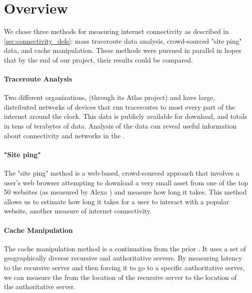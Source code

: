 \section{Overview}\label{sec:methods_overview}

We chose three methods for measuring internet connectivity as described in \cref{sec:connectivity_defs}: mass traceroute data analysis, crowd-sourced "site ping" data, and \dns cache manipulation. These methods were pursued in parallel in hopes that by the end of our project, their results could be compared.

\paragraph{Traceroute Analysis}  Two different organizations, \ripe (through its Atlas project) and \caida have large, distributed networks of devices that run traceroutes to most every part of the internet around the clock. This data is publicly available for download, and totals in tens of terabytes of data. Analysis of the data can reveal useful information about connectivity and networks in the \us.

\paragraph{"Site ping"} The "site ping" method is a web-based, crowd-sourced approach that involves a user's web browser attempting to download a very small asset from one of the top 50 websites (as measured by Alexa \cite{Tachalova2017})  and measure how long it takes. This method allows us to estimate how long it takes for a user to interact with a popular website, another measure of internet connectivity.

\paragraph{\dns Cache Manipulation} The \dns cache manipulation method is a continuation from the prior \mqp. It uses a set of geographically diverse recursive and authoritative \dns servers. By measuring latency to the recursive \dns server and then forcing it to go to a specific authoritative server, we can measure the \rtt from the location of the recursive server to the location of the authoritative server.